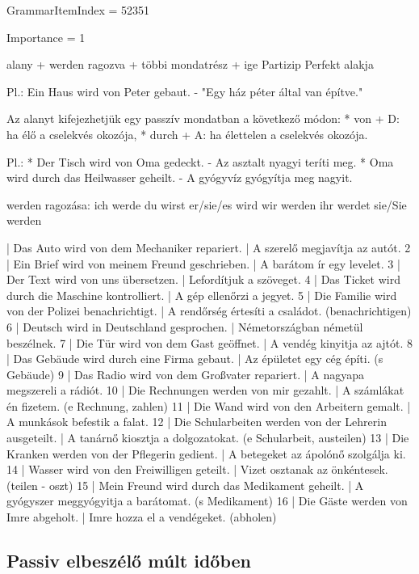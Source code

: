 \documentclass{article}
\newenvironment{desc}{\verbatim}{\endverbatim}
\newenvironment{exmp}{\verbatim}{\endverbatim}
\begin{document}
GrammarItemIndex = 52351

Importance = 1

\begin{desc}
alany + werden ragozva + többi mondatrész + ige Partizip Perfekt alakja

Pl.: Ein Haus wird von Peter gebaut. - "Egy ház péter által van építve."

Az alanyt kifejezhetjük egy passzív mondatban a következő módon:
* von + D: ha élő a cselekvés okozója,
* durch + A: ha élettelen a cselekvés okozója.

Pl.: * Der Tisch wird von Oma gedeckt. - Az asztalt nyagyi teríti meg.
* Oma wird durch das Heilwasser geheilt. - A gyógyvíz gyógyítja meg nagyit.

werden ragozása:
ich werde
du wirst
er/sie/es wird
wir werden
ihr werdet
sie/Sie werden
\end{desc}

\begin{exmp}
1 | Das Auto wird von dem Mechaniker repariert. | A szerelő megjavítja az autót.
2 | Ein Brief wird von meinem Freund geschrieben. | A barátom ír egy levelet.
3 | Der Text wird von uns übersetzen. | Lefordítjuk a szöveget.
4 | Das Ticket wird durch die Maschine kontrolliert. | A gép ellenőrzi a jegyet.
5 | Die Familie wird von der Polizei benachrichtigt. | A rendőrség értesíti a családot. (benachrichtigen)
6 | Deutsch wird in Deutschland gesprochen. | Németországban németül beszélnek.
7 | Die Tür wird von dem Gast geöffnet. | A vendég kinyitja az ajtót.
8 | Das Gebäude wird durch eine Firma gebaut. | Az épületet egy cég építi. (s Gebäude)
9 | Das Radio wird von dem Großvater repariert. | A nagyapa megszereli a rádiót.
10 | Die Rechnungen werden von mir gezahlt. | A számlákat én fizetem. (e Rechnung, zahlen)
11 | Die Wand wird von den Arbeitern gemalt. | A munkások befestik a falat.
12 | Die Schularbeiten werden von der Lehrerin ausgeteilt. | A tanárnő kiosztja a dolgozatokat. (e Schularbeit, austeilen)
13 | Die Kranken werden von der Pflegerin gedient. | A betegeket az ápolónő szolgálja ki.
14 | Wasser wird von den Freiwilligen geteilt. | Vizet osztanak az önkéntesek. (teilen - oszt)
15 | Mein Freund wird durch das Medikament geheilt. | A gyógyszer meggyógyitja a barátomat. (s Medikament)
16 | Die Gäste werden von Imre abgeholt. | Imre hozza el a vendégeket. (abholen)
\end{exmp}

\subsection{Passiv elbeszélő múlt időben}
\end{document}
